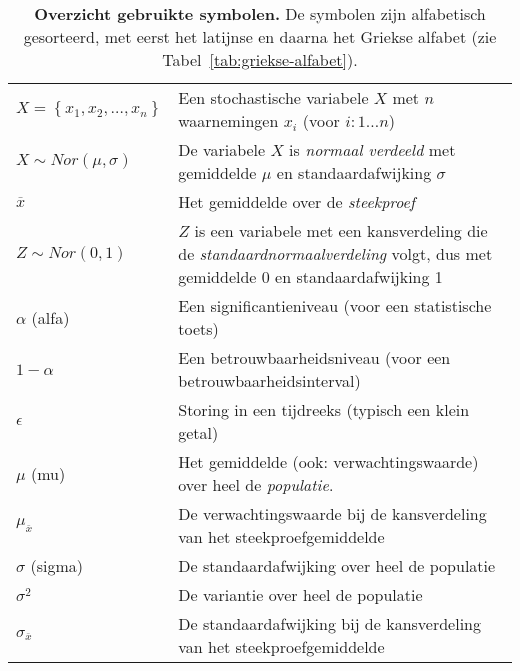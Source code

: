 \begin{table}
\begin{tabular}{p{}p{}}
  	$X = \left\{x_1, x_2, \ldots, x_n \right\}$             & Een stochastische variabele $X$ met $n$ waarnemingen $x_i$ (voor $i: 1 \ldots n$)                                                      \\
  	$X \sim Nor(\mu, \sigma)$                               & De variabele $X$ is \emph{normaal verdeeld} met gemiddelde $\mu$ en standaardafwijking $\sigma$                                        \\
  	$\overline{x}$                                          & Het gemiddelde over de \emph{steekproef}                                                                                               \\
  	$Z \sim Nor(0, 1)$                                      & $Z$ is een variabele met een kansverdeling die de \emph{standaardnormaalverdeling} volgt, dus met gemiddelde 0 en standaardafwijking 1 \\
  	$\alpha$ (alfa)                                         & Een significantieniveau (voor een statistische toets)                                                                                  \\
  	$1 - \alpha$                                            & Een betrouwbaarheidsniveau (voor een betrouwbaarheidsinterval)                                                                         \\
  	$\epsilon$                                              & Storing in een tijdreeks (typisch een klein getal)                                                                                     \\
  	$\mu$ (mu)                                              & Het gemiddelde (ook: verwachtingswaarde) over heel de \emph{populatie}.                                                                \\
  	$\mu_{\overline{x}}$                                    & De verwachtingswaarde bij de kansverdeling van het steekproefgemiddelde                                                                \\
  	$\sigma$ (sigma)                                        & De standaardafwijking over heel de populatie                                                                                           \\
  	$\sigma^2$                                              & De variantie over heel de populatie                                                                                                    \\
  	$\sigma_{\overline{x}}$                                 & De standaardafwijking bij de kansverdeling van het steekproefgemiddelde                                                                \\
  	\bottomrule
  \end{tabular}
  \caption[Overzicht gebruikte symbolen.]{\textbf{Overzicht gebruikte symbolen.} De symbolen zijn alfabetisch gesorteerd, met eerst het latijnse en daarna het Griekse alfabet (zie Tabel~\ref{tab:griekse-alfabet}).}
  \label{tab:notatie}
\end{table}

